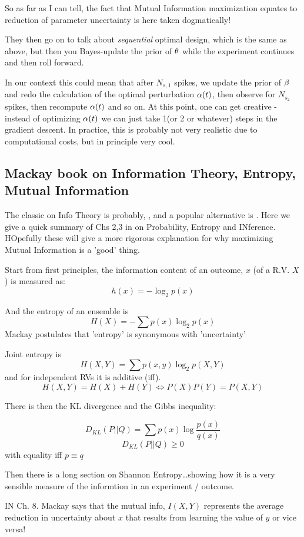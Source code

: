\documentclass{article}
\begin{document}
So as far as I can tell, the fact that Mutual Information maximization equates
to reduction of parameter uncertainty is here taken dogmatically!

They then go on to talk about { \sl sequential } optimal design, which is the
same as above, but then you Bayes-update the prior of ${\theta}$ while the experiment
continues and then roll forward. 

In our context this could mean that after $N_{s,1}$ spikes, we update the prior
of ${\beta}$ and redo the calculation of the optimal perturbation ${\alpha}(t)$, then
observe for $N_{s_2}$ spikes, then recompute ${\alpha}(t)$ and so on. At this point,
one can get creative - instead of optimizing ${\alpha}(t)$ we can just take 1(or 2 or
whatever) steps in the gradient descent. In practice, this is probably
not very realistic due to computational costs, but in principle very cool.

\subsection{Mackay book on Information Theory, Entropy, Mutual
Information}

The classic on Info Theory is probably, \cite{Cover2006}, and a popular
alternative is \cite{MacKay2003}. Here we give a quick summary of Chs 2,3 in
\cite{MacKay2003} on Probability, Entropy and INference. HOpefully these will
give a more rigorous explanation for why maximizing Mutual Information is a
'good' thing. 

Start from first principles, the information content of an outcome, $x$ (of a
  R.V. $X$) is measured as:
  $$ h(x) = -\log_2 p(x)$$

And the entropy of an ensemble is 
$$ H(X) = -\sum p(x) \log_2 p(x)$$
Mackay postulates that 'entropy' is synonymous with 'uncertainty'

Joint entropy is 
$$ H(X,Y) = \sum p(x,y) \log_2 p(X,Y)$$ and for independent RVs it is additive
(iff). 
$$
H(X,Y) =  H(X) + H(Y) \iff P(X)P(Y) = P(X,Y)
$$

There is then the KL divergence  and the Gibbs inequality:

$$D_{KL} (P||Q) = \sum p(x) \log \frac{p(x)}{q(x)}$$
$$D_{KL} (P||Q)  \geq 0$$ with equality iff $p \equiv q$

Then there is a long section on Shannon Entropy\ldots showing how it is a very
sensible measure of the informtion in an experiment / outcome. 

IN Ch. 8. Mackay says that the mutual info, $I(X,Y)$ represents the average
reduction in uncertainty about $x$ that results from learning the value of $y$
or vice versa! 
\end{document}
